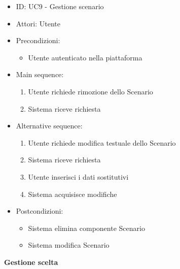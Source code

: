 \documentclass{article}
\begin{document}
\begin{itemize}[label = { }]
    \itemsep0px
    \item ID: UC9 - Gestione scenario
    \item Attori: Utente
    \item Precondizioni: 
        \begin{itemize}[label = {-}]
            \item Utente autenticato nella piattaforma
        \end{itemize}
    \item Main sequence: 
        \begin{enumerate}
            \item Utente richiede rimozione dello Scenario
            \item Sistema riceve richiesta
        \end{enumerate}
    \item Alternative sequence:
        \begin{enumerate}
            \item Utente richiede modifica testuale dello Scenario
            \item Sistema riceve richiesta
            \item Utente inserisci i dati sostitutivi
            \item Sistema acquisisce modifiche
        \end{enumerate}
    \item Postcondizioni: 
        \begin{itemize}[label = {-}]
            \item Sistema elimina componente Scenario
            \item Sistema modifica Scenario
        \end{itemize}
\end{itemize}
\textbf{Gestione scelta}
\end{document}
